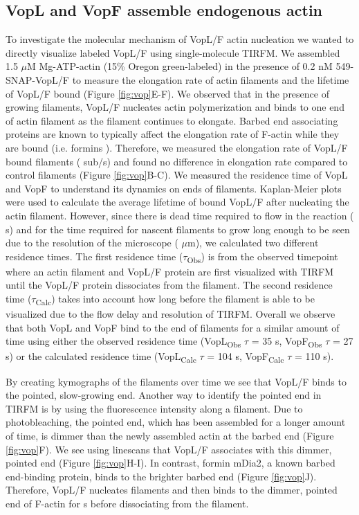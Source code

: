 \subsection{VopL and VopF assemble endogenous actin}\label{vops}
To investigate the molecular mechanism of VopL/F actin nucleation we wanted to directly visualize labeled VopL/F using single-molecule TIRFM. We assembled 1.5 $\mu$M Mg-ATP-actin (15\% Oregon green-labeled) in the presence of 0.2 nM 549-SNAP-VopL/F to measure the elongation rate of actin filaments and the lifetime of VopL/F bound (Figure \ref{fig:vop}E-F). We observed that in the presence of growing filaments, VopL/F nucleates actin polymerization and binds to one end of actin filament as the filament continues to elongate. Barbed end associating proteins are known to typically affect the elongation rate of F-actin while they are bound (i.e. formins \citep{kovar_molecular_2006}). Therefore, we measured the elongation rate of VopL/F bound filaments ( sub/s) and found no difference in elongation rate compared to control filaments (Figure \ref{fig:vop}B-C). We measured the residence time of VopL and VopF to understand its dynamics on ends of filaments. Kaplan-Meier plots were used to calculate the average lifetime of bound VopL/F after nucleating the actin filament. However, since there is dead time required to flow in the reaction ( s) and for the time required for nascent filaments to grow long enough to be seen due to the resolution of the microscope ( $\mu$m), we calculated two different residence times. The first residence time ($\tau$\textsubscript{Obs}) is from the observed timepoint where an actin filament and VopL/F protein are first visualized with TIRFM until the VopL/F protein dissociates from the filament. The second residence time ($\tau$\textsubscript{Calc}) takes into account how long before the filament is able to be visualized due to the flow delay and resolution of TIRFM. Overall we observe that both VopL and VopF bind to the end of filaments for a similar amount of time using either the observed residence time (VopL\textsubscript{Obs} $\tau$ = 35 s, VopF\textsubscript{Obs} $\tau$ = 27 s) or the calculated residence time (VopL\textsubscript{Calc} $\tau$ = 104 s, VopF\textsubscript{Calc} $\tau$ = 110 s). 

By creating kymographs of the filaments over time we see that VopL/F binds to the pointed, slow-growing end. Another way to identify the pointed end in TIRFM is by using the fluorescence intensity along a filament. Due to photobleaching, the pointed end, which has been assembled for a longer amount of time, is dimmer than the newly assembled actin at the barbed end (Figure \ref{fig:vop}F). We see using linescans that VopL/F associates with this dimmer, pointed end (Figure \ref{fig:vop}H-I). In contrast, formin mDia2, a known barbed end-binding protein, binds to the brighter barbed end (Figure \ref{fig:vop}J). Therefore, VopL/F nucleates filaments and then binds to the dimmer, pointed end of F-actin for  s before dissociating from the filament.

